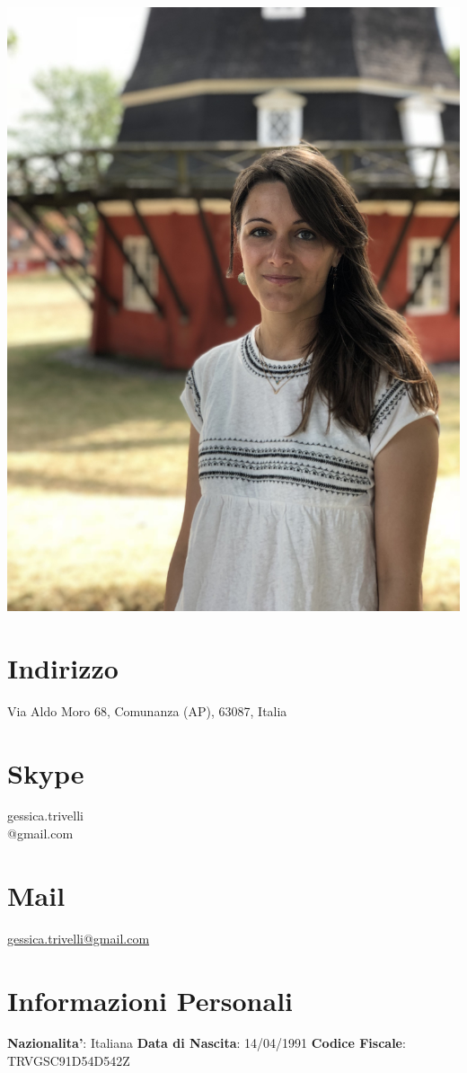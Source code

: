 \documentclass[11pt]{friggeri-cv}
\begin{document}

\begin{aside}
  \includegraphics[width=0.95\columnwidth]{img/IMG_2838}
  \section{Indirizzo}\footnotesize{
    Via Aldo Moro 68,
    Comunanza (AP), 63087, Italia}
  \section{Skype}\footnotesize{
    gessica.trivelli\\@gmail.com}
  \section{Mail}\footnotesize{
    \href{mailto:gessica.trivelli@gmail.com}{gessica.trivelli@gmail.com}}
  \section{Informazioni Personali}\footnotesize{
    \textbf{Nazionalita'}: 
    Italiana
    \textbf{Data di Nascita}: 14/04/1991
    \textbf{Codice Fiscale}: TRVGSC91D54D542Z}
\end{aside}
\end{document}
